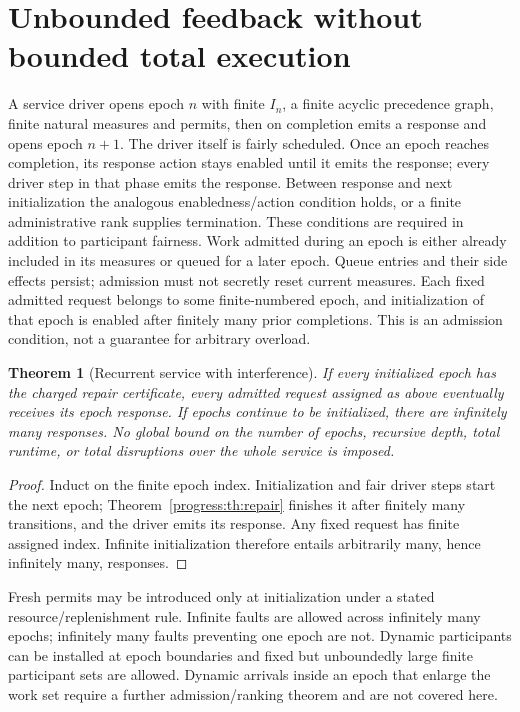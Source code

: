\documentclass[11pt]{article}
\newtheorem{theorem}{Theorem}[section]
\begin{document}
\section{Unbounded feedback without bounded total execution}
A service driver opens epoch $n$ with finite $I_n$, a finite acyclic precedence graph, finite natural measures and permits, then on completion emits a response and opens epoch $n+1$. The driver itself is fairly scheduled. Once an epoch reaches completion, its response action stays enabled until it emits the response; every driver step in that phase emits the response. Between response and next initialization the analogous enabledness/action condition holds, or a finite administrative rank supplies termination. These conditions are required in addition to participant fairness. Work admitted during an epoch is either already included in its measures or queued for a later epoch. Queue entries and their side effects persist; admission must not secretly reset current measures. Each fixed admitted request belongs to some finite-numbered epoch, and initialization of that epoch is enabled after finitely many prior completions. This is an admission condition, not a guarantee for arbitrary overload.

\begin{theorem}[Recurrent service with interference]
If every initialized epoch has the charged repair certificate, every admitted request assigned as above eventually receives its epoch response. If epochs continue to be initialized, there are infinitely many responses. No global bound on the number of epochs, recursive depth, total runtime, or total disruptions over the whole service is imposed.
\end{theorem}
\begin{proof}
Induct on the finite epoch index. Initialization and fair driver steps start the next epoch; Theorem~\ref{progress:th:repair} finishes it after finitely many transitions, and the driver emits its response. Any fixed request has finite assigned index. Infinite initialization therefore entails arbitrarily many, hence infinitely many, responses.
\end{proof}
Fresh permits may be introduced only at initialization under a stated resource/replenishment rule. Infinite faults are allowed across infinitely many epochs; infinitely many faults preventing one epoch are not. Dynamic participants can be installed at epoch boundaries and fixed but unboundedly large finite participant sets are allowed. Dynamic arrivals inside an epoch that enlarge the work set require a further admission/ranking theorem and are not covered here.
\end{document}
